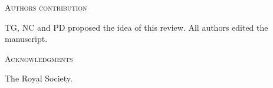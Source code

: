 \documentclass[12pt,letterpaper]{article}
\renewcommand{\section}[1]{%
\bigskip
\begin{center}
\begin{Large}
\normalfont\scshape #1
\medskip
\end{Large}
\end{center}}
\begin{document}


\section{Authors contribution}
TG, NC and PD proposed the idea of this review. All authors edited the manuscript.

\section{Acknowledgments}
The Royal Society.



\end{document}
